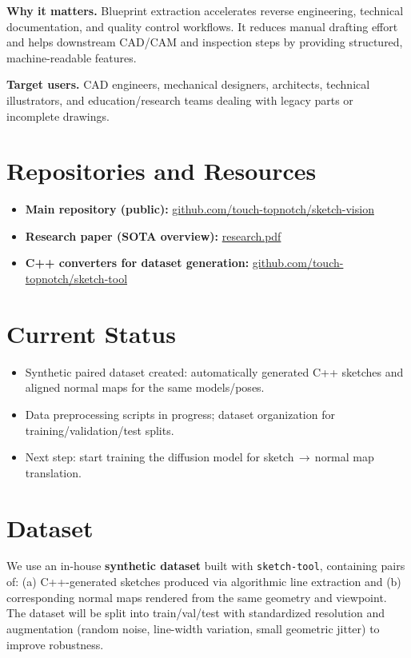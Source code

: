 \documentclass[11pt,a4paper]{article}
\begin{document}
\textbf{Why it matters.} Blueprint extraction accelerates reverse engineering, technical documentation, and quality control workflows. It reduces manual drafting effort and helps downstream CAD/CAM and inspection steps by providing structured, machine-readable features.

\textbf{Target users.} CAD engineers, mechanical designers, architects, technical illustrators, and education/research teams dealing with legacy parts or incomplete drawings.

\section{Repositories and Resources}
\begin{itemize}[leftmargin=*]
  \item \textbf{Main repository (public):} \href{https://github.com/touch-topnotch/sketch-vision}{github.com/touch-topnotch/sketch-vision}
  \item \textbf{Research paper (SOTA overview):} \href{https://github.com/touch-topnotch/sketch-vision/blob/main/docs/sketch-vision-eng.pdf}{research.pdf}
  \item \textbf{C++ converters for dataset generation:} \href{https://github.com/touch-topnotch/sketch-tool}{github.com/touch-topnotch/sketch-tool}
\end{itemize}

\section{Current Status}
\begin{itemize}[leftmargin=*]
  \item Synthetic paired dataset created: automatically generated C++ sketches and aligned normal maps for the same models/poses.
  \item Data preprocessing scripts in progress; dataset organization for training/validation/test splits.
  \item Next step: start training the diffusion model for sketch\,$\rightarrow$\,normal map translation.
\end{itemize}

\section{Dataset}
We use an in-house \textbf{synthetic dataset} built with \texttt{sketch-tool}, containing pairs of: (a) C++-generated sketches produced via algorithmic line extraction and (b) corresponding normal maps rendered from the same geometry and viewpoint. The dataset will be split into train/val/test with standardized resolution and augmentation (random noise, line-width variation, small geometric jitter) to improve robustness.
\end{document}
